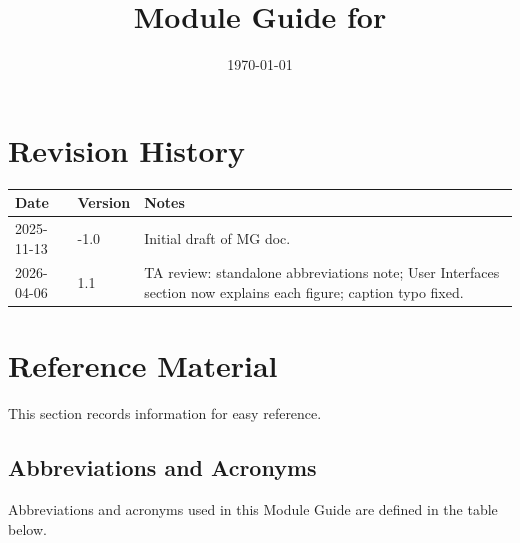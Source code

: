\documentclass[12pt, titlepage]{article}
\begin{document}
\title{Module Guide for \progname{}} 
\author{\authname}
\date{\today}

\maketitle


\section{Revision History}

\begin{tabularx}{\textwidth}{p{3cm}p{2cm}X}
\toprule {\bf Date} & {\bf Version} & {\bf Notes}\\
\midrule
2025-11-13 & -1.0 & Initial draft of MG doc.\\
2026-04-06 & 1.1 & TA review: standalone abbreviations note; User Interfaces section now explains each figure; caption typo fixed.\\
\bottomrule
\end{tabularx}

\newpage

\section{Reference Material}

This section records information for easy reference.

\subsection{Abbreviations and Acronyms}

\noindent
Abbreviations and acronyms used in this Module Guide are defined in the table below.
\end{document}
